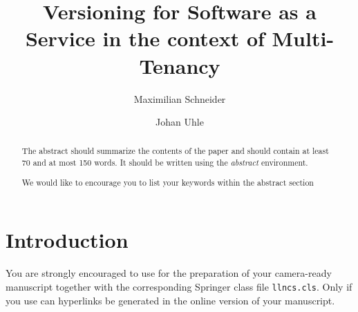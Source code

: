 \documentclass[runningheads,a4paper]{llncs}
\newcommand{\keywords}[1]{\par\addvspace\baselineskip
\noindent\keywordname\enspace\ignorespaces#1}
\begin{document}
\mainmatter  %

\title{Versioning for Software as a Service in the context of Multi-Tenancy}


%
%
\author{Maximilian Schneider \and Johan Uhle}
%


%
%

\maketitle


\begin{abstract}
The abstract should summarize the contents of the paper and should
contain at least 70 and at most 150 words. It should be written using the
\emph{abstract} environment.
\keywords{We would like to encourage you to list your keywords within
the abstract section}
\end{abstract}


\section{Introduction}

You are strongly encouraged to use \LaTeXe{} for the
preparation of your camera-ready manuscript together with the
corresponding Springer class file \verb+llncs.cls+. Only if you use
\LaTeXe{} can hyperlinks be generated in the online version
of your manuscript.
\end{document}
